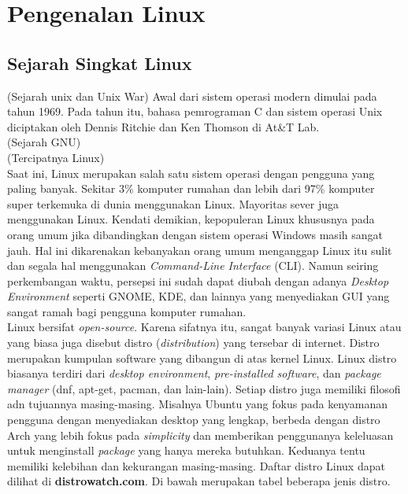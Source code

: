\chapter{Pengenalan Linux}

\section{Sejarah Singkat Linux}
(Sejarah unix dan Unix War) Awal dari sistem operasi modern dimulai pada tahun 1969. Pada tahun itu, bahasa pemrograman C dan sistem operasi Unix diciptakan oleh Dennis Ritchie dan Ken Thomson di At\&T Lab. \\ 

(Sejarah GNU) \\ 

(Tercipatnya Linux) \\ 

Saat ini, Linux merupakan salah satu sistem operasi dengan pengguna yang paling banyak. Sekitar 3\% komputer rumahan dan lebih dari 97\% 
komputer super terkemuka di dunia menggunakan Linux. Mayoritas sever juga menggunakan Linux. Kendati demikian, kepopuleran Linux khususnya pada
orang umum jika dibandingkan dengan sistem operasi Windows masih sangat jauh. Hal ini dikarenakan kebanyakan orang umum menganggap Linux itu 
sulit dan segala hal menggunakan \textit{Command-Line Interface} (CLI). Namun seiring perkembangan waktu, persepsi ini sudah dapat diubah 
dengan adanya \textit{Desktop Environment} seperti GNOME, KDE, dan lainnya yang menyediakan GUI yang sangat ramah bagi pengguna 
komputer rumahan.\\

Linux bersifat \textit{open-source}. Karena sifatnya itu, sangat banyak variasi Linux atau yang biasa juga disebut distro 
(\textit{distribution}) yang tersebar di internet. Distro merupakan kumpulan software yang dibangun di atas kernel Linux. Linux distro 
biasanya terdiri dari \textit{desktop environment}, \textit{pre-installed software}, dan \textit{package manager} (dnf, apt-get, pacman, 
dan lain-lain). Setiap distro juga memiliki filosofi adn tujuannya masing-masing. Misalnya Ubuntu yang fokus pada kenyamanan pengguna dengan 
menyediakan desktop yang lengkap, berbeda dengan distro Arch yang lebih fokus pada \textit{simplicity} dan memberikan penggunanya keleluasan 
untuk menginstall \textit{package} yang hanya mereka butuhkan. Keduanya tentu memiliki kelebihan dan kekurangan masing-masing. Daftar distro 
Linux dapat dilihat di \textbf{distrowatch.com}. Di bawah merupakan tabel beberapa jenis distro.
